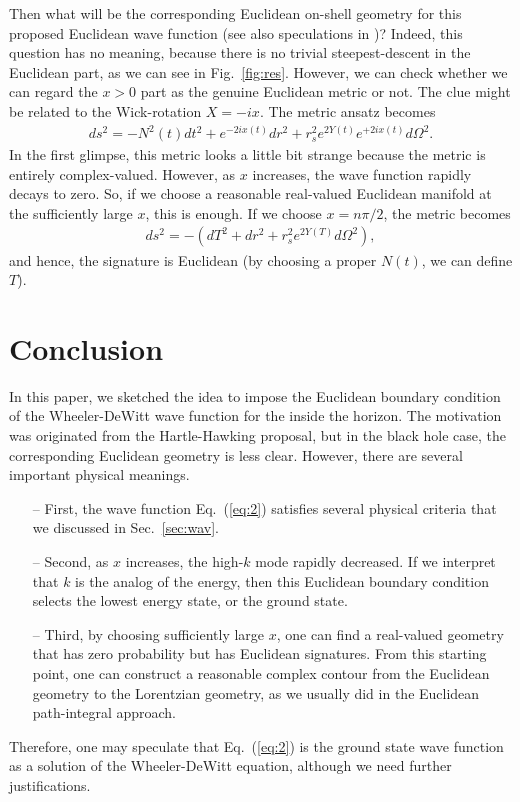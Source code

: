 \documentclass{andromedaone}
\begin{document}
Then what will be the corresponding Euclidean on-shell geometry for this proposed Euclidean wave function (see also speculations in \cite{Chen:2016ask})? Indeed, this question has no meaning, because there is no trivial steepest-descent in the Euclidean part, as we can see in Fig.~\ref{fig:res}. However, we can check whether we can regard the $x > 0$ part as the genuine Euclidean metric or not. The clue might be related to the Wick-rotation $X = - ix$. The metric ansatz becomes
\begin{eqnarray}
ds^{2} = - N^{2}(t) dt^{2} + e^{-2ix(t)} dr^{2} + r_{s}^{2} e^{2Y(t)}e^{+2ix(t)} d\Omega^{2}.
\end{eqnarray}
In the first glimpse, this metric looks a little bit strange because the metric is entirely complex-valued. However, as $x$ increases, the wave function rapidly decays to zero. So, if we choose a reasonable real-valued Euclidean manifold at the sufficiently large $x$, this is enough. If we choose $x = n\pi/2$, the metric becomes
\begin{eqnarray}
ds^{2} = - \left( dT^{2} + dr^{2} + r_{s}^{2} e^{2Y(T)} d\Omega^{2} \right),
\end{eqnarray}
and hence, the signature is Euclidean (by choosing a proper $N(t)$, we can define $T$).




\section{Conclusion}

In this paper, we sketched the idea to impose the Euclidean boundary condition of the Wheeler-DeWitt wave function for the inside the horizon. The motivation was originated from the Hartle-Hawking proposal, but in the black hole case, the corresponding Euclidean geometry is less clear. However, there are several important physical meanings.
\begin{itemize}
\item[--] First, the wave function Eq.~(\ref{eq:2}) satisfies several physical criteria that we discussed in Sec.~\ref{sec:wav}.
\item[--] Second, as $x$ increases, the high-$k$ mode rapidly decreased. If we interpret that $k$ is the analog of the energy, then this Euclidean boundary condition selects the lowest energy state, or the ground state.
\item[--] Third, by choosing sufficiently large $x$, one can find a real-valued geometry that has zero probability but has Euclidean signatures. From this starting point, one can construct a reasonable complex contour from the Euclidean geometry to the Lorentzian geometry, as we usually did in the Euclidean path-integral approach.
\end{itemize}
Therefore, one may speculate that Eq.~(\ref{eq:2}) is the ground state wave function as a solution of the Wheeler-DeWitt equation, although we need further justifications.
\end{document}
